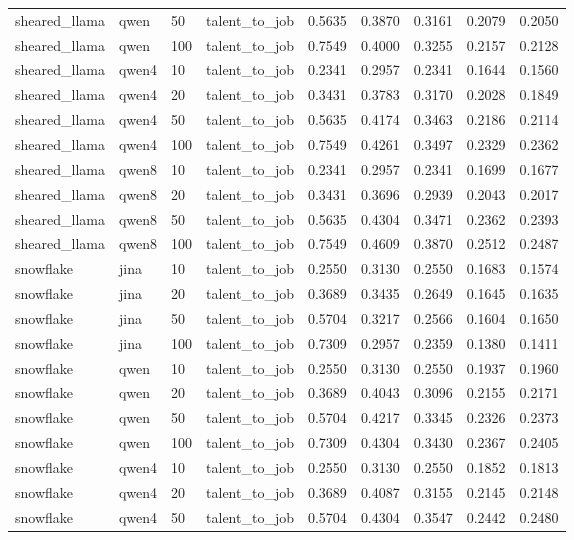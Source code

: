 \begin{table}[t]
\begin{tabular}{lllllllll}
sheared_llama & qwen & 50 & talent_to_job & 0.5635 & 0.3870 & 0.3161 & 0.2079 & 0.2050 \\
sheared_llama & qwen & 100 & talent_to_job & 0.7549 & 0.4000 & 0.3255 & 0.2157 & 0.2128 \\
sheared_llama & qwen4 & 10 & talent_to_job & 0.2341 & 0.2957 & 0.2341 & 0.1644 & 0.1560 \\
sheared_llama & qwen4 & 20 & talent_to_job & 0.3431 & 0.3783 & 0.3170 & 0.2028 & 0.1849 \\
sheared_llama & qwen4 & 50 & talent_to_job & 0.5635 & 0.4174 & 0.3463 & 0.2186 & 0.2114 \\
sheared_llama & qwen4 & 100 & talent_to_job & 0.7549 & 0.4261 & 0.3497 & 0.2329 & 0.2362 \\
sheared_llama & qwen8 & 10 & talent_to_job & 0.2341 & 0.2957 & 0.2341 & 0.1699 & 0.1677 \\
sheared_llama & qwen8 & 20 & talent_to_job & 0.3431 & 0.3696 & 0.2939 & 0.2043 & 0.2017 \\
sheared_llama & qwen8 & 50 & talent_to_job & 0.5635 & 0.4304 & 0.3471 & 0.2362 & 0.2393 \\
sheared_llama & qwen8 & 100 & talent_to_job & 0.7549 & 0.4609 & 0.3870 & 0.2512 & 0.2487 \\
snowflake & jina & 10 & talent_to_job & 0.2550 & 0.3130 & 0.2550 & 0.1683 & 0.1574 \\
snowflake & jina & 20 & talent_to_job & 0.3689 & 0.3435 & 0.2649 & 0.1645 & 0.1635 \\
snowflake & jina & 50 & talent_to_job & 0.5704 & 0.3217 & 0.2566 & 0.1604 & 0.1650 \\
snowflake & jina & 100 & talent_to_job & 0.7309 & 0.2957 & 0.2359 & 0.1380 & 0.1411 \\
snowflake & qwen & 10 & talent_to_job & 0.2550 & 0.3130 & 0.2550 & 0.1937 & 0.1960 \\
snowflake & qwen & 20 & talent_to_job & 0.3689 & 0.4043 & 0.3096 & 0.2155 & 0.2171 \\
snowflake & qwen & 50 & talent_to_job & 0.5704 & 0.4217 & 0.3345 & 0.2326 & 0.2373 \\
snowflake & qwen & 100 & talent_to_job & 0.7309 & 0.4304 & 0.3430 & 0.2367 & 0.2405 \\
snowflake & qwen4 & 10 & talent_to_job & 0.2550 & 0.3130 & 0.2550 & 0.1852 & 0.1813 \\
snowflake & qwen4 & 20 & talent_to_job & 0.3689 & 0.4087 & 0.3155 & 0.2145 & 0.2148 \\
snowflake & qwen4 & 50 & talent_to_job & 0.5704 & 0.4304 & 0.3547 & 0.2442 & 0.2480 \\

\end{tabular}
\end{table}
